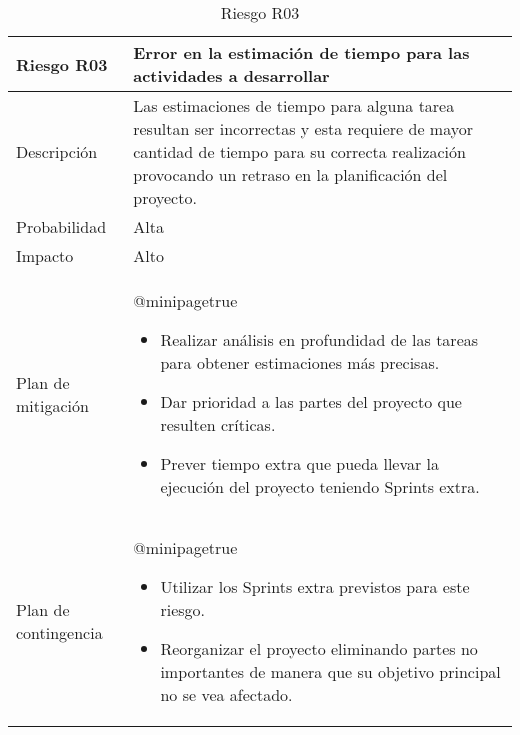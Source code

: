 \begin{table}[]
	\centering
	\begin{tabularx}{\textwidth}{|l|X|}
		\hline
		\rowcolor[HTML]{C0C0C0} 
		\textbf{Riesgo R03}  & \textbf{Error en la estimación de tiempo para las actividades a desarrollar} \\ \hline
		Descripción          & Las estimaciones de tiempo para alguna tarea resultan ser incorrectas y esta requiere de mayor cantidad de tiempo para su correcta realización provocando un retraso en la planificación del proyecto. \\ \hline
		Probabilidad         & Alta \\ \hline
		Impacto              & Alto \\ \hline
		Plan de mitigación   & \csname @minipagetrue\endcsname \begin{itemize}[leftmargin=*, noitemsep, topsep=0pt]
			\item Realizar análisis en profundidad de las tareas para obtener estimaciones más precisas.
			\item Dar prioridad a las partes del proyecto que resulten críticas.
			\item Prever tiempo extra que pueda llevar la ejecución del proyecto teniendo Sprints extra.
		\end{itemize} \\ \hline
		Plan de contingencia & \csname @minipagetrue\endcsname \begin{itemize}[leftmargin=*, noitemsep, topsep=0pt]
			\item Utilizar los Sprints extra previstos para este riesgo.
			\item Reorganizar el proyecto eliminando partes no importantes de manera que su objetivo principal no se vea afectado.
		\end{itemize} \\ \hline
	\end{tabularx}
	\caption{Riesgo R03}
	\label{riesgo_3}
\end{table}

